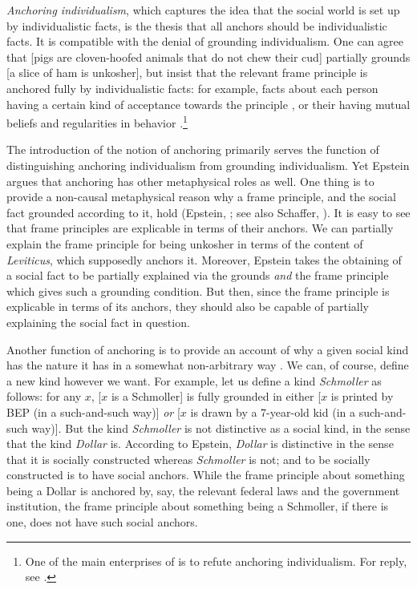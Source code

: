 \documentclass[12pt]{article}
\begin{document}
\par
\textit{Anchoring individualism}, which captures the idea that the social world is set up by individualistic facts, is the thesis that all anchors should be individualistic facts. It is compatible with the denial of grounding individualism. One can agree that [pigs are cloven-hoofed animals that do not chew their cud] partially grounds [a slice of ham is unkosher], but insist that the relevant frame principle is anchored fully by individualistic facts: for example, facts about each person having a certain kind of acceptance towards the principle \citep{Searle1995-SEATCO}, or their having mutual beliefs and regularities in behavior \citep[Book~3]{Hume1978-SELTOH-3}.\footnote{One of the main enterprises of \citet{Epstein2015-EPSTAT} is to refute anchoring individualism. For reply, see \citet{Francesco2016-FRAEOA-10}.}

\par
The introduction of the notion of anchoring primarily serves the function of distinguishing anchoring individualism from grounding individualism. Yet Epstein argues that anchoring has other metaphysical roles as well. One thing is to provide a non-causal metaphysical reason why a frame principle, and the social fact grounded according to it, hold (Epstein, \citeyear{Epstein2015-EPSAFF}; see also Schaffer, \citeyear{Schaffer2019-SCHAAG-5}). It is easy to see that frame principles are explicable in terms of their anchors. We can partially explain the frame principle for being unkosher in terms of the content of \textit{Leviticus}, which supposedly anchors it. Moreover, Epstein takes the obtaining of a social fact to be partially explained via the grounds \textit{and} the frame principle which gives such a grounding condition. But then, since the frame principle is explicable in terms of its anchors, they should also be capable of partially explaining the social fact in question. 

\par
Another function of anchoring is to provide an account of why a given social kind has the nature it has in a somewhat non-arbitrary way \citep{Epstein2014-EPSHMK,Epstein2025-EPSSOQ}. We can, of course, define a new kind however we want. For example, let us define a kind \textit{Schmoller} as follows: for any $x$, [$x$ is a Schmoller] is fully grounded in either [$x$ is printed by BEP (in a such-and-such way)] \textit{or} [$x$ is drawn by a 7-year-old kid (in a such-and-such way)]. But the kind \textit{Schmoller} is not distinctive as a social kind, in the sense that the kind \textit{Dollar} is. According to Epstein, \textit{Dollar} is distinctive in the sense that it is socially constructed whereas \textit{Schmoller} is not; and to be socially constructed is to have social anchors. While the frame principle about something being a Dollar is anchored by, say, the relevant federal laws and the government institution, the frame principle about something being a Schmoller, if there is one, does not have such social anchors. 
\end{document}
